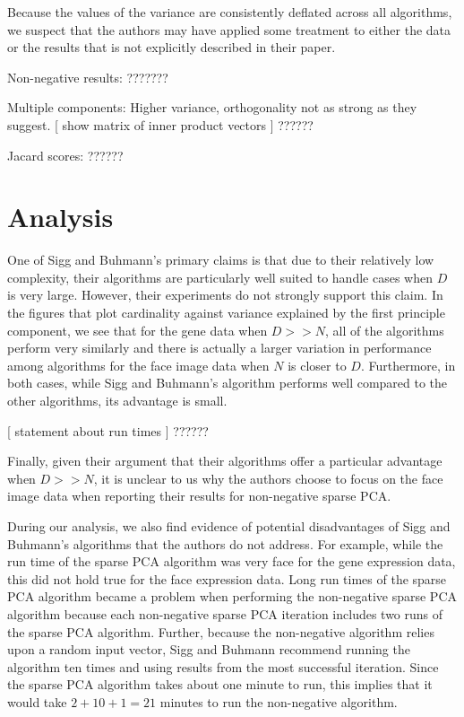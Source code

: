 \documentclass[twocolumn]{article}
\begin{document}
Because the values of the variance are consistently deflated
across all algorithms, we suspect that the authors may have
applied some treatment to either the data or the results
that is not explicitly described in their paper.

Non-negative results: ???????

Multiple components: Higher variance, orthogonality not as strong
as they suggest. [ show matrix of inner product vectors ] ??????

Jacard scores: ??????

\section{Analysis}

One of Sigg and Buhmann's primary claims is that due to their
relatively low complexity, their algorithms are particularly
well suited to handle cases when $D$ is very large.
However, their experiments do not strongly support this claim.
In the figures that plot cardinality against variance
explained by the first principle component, we see that for the
gene data when $D >> N$, all of the algorithms perform very
similarly and there is actually a larger variation in performance
among algorithms for the face image data when $N$ is closer to $D$.
Furthermore, in both cases, while Sigg and Buhmann's algorithm
performs well compared to the other algorithms, its advantage is small.

[ statement about run times ] ??????

Finally, given their argument that their algorithms offer a particular
advantage when $D >> N$, it is unclear to us why the authors choose
to focus on the face image data when reporting their results for
non-negative sparse PCA.

During our analysis, we also find evidence of potential disadvantages
of Sigg and Buhmann's algorithms that the authors do not address.
For example, while the run time of the sparse PCA algorithm was
very face for the gene expression data, this did not hold true for
the face expression data. Long run times of the sparse PCA algorithm
became a problem when performing the non-negative sparse PCA algorithm
because each non-negative sparse PCA iteration includes two runs
of the sparse PCA algorithm. Further, because the non-negative
algorithm relies upon a random input vector, Sigg and Buhmann
recommend running the algorithm ten times and using results from
the most successful iteration. Since the sparse PCA algorithm takes
about one minute to run, this implies that it would take $2+10+1=21$
minutes to run the non-negative algorithm.
\end{document}
